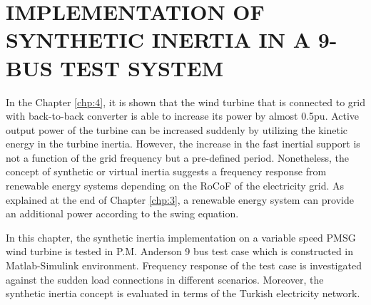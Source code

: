 \chapter{IMPLEMENTATION OF SYNTHETIC INERTIA IN A 9-BUS TEST SYSTEM}
\label{chp:5}
In the Chapter \ref{chp:4}, it is shown that the wind turbine that is connected to grid with back-to-back converter is able to increase its power by almost 0.5pu. Active output power of the turbine can be increased suddenly by utilizing the kinetic energy in the turbine inertia. However, the increase in the fast inertial support is not a function of the grid frequency but a pre-defined period. Nonetheless, the concept of synthetic or virtual inertia suggests a frequency response from renewable energy systems depending on the RoCoF of the electricity grid. As explained at the end of Chapter \ref{chp:3}, a renewable energy system can provide an additional power according to the swing equation. \par
In this chapter, the synthetic inertia implementation on a variable speed PMSG wind turbine is tested in P.M. Anderson 9 bus test case which is constructed in Matlab-Simulink environment. Frequency response of the test case is investigated against the sudden load connections in different scenarios. Moreover, the synthetic inertia concept is evaluated in terms of the Turkish electricity network.
